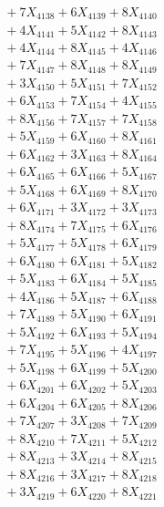 \documentclass[a4paper,10pt]{article}
\begin{document}
{\begin{align}
&\;  + 7 X_{4138} + 6 X_{4139} + 8 X_{4140} \\[0.3ex]
&\;  + 4 X_{4141} + 5 X_{4142} + 8 X_{4143} \\[0.3ex]
&\;  + 4 X_{4144} + 8 X_{4145} + 4 X_{4146} \\[0.3ex]
&\;  + 7 X_{4147} + 8 X_{4148} + 8 X_{4149} \\[0.5ex]\allowbreak
&\;  + 3 X_{4150} + 5 X_{4151} + 7 X_{4152} \\[0.3ex]
&\;  + 6 X_{4153} + 7 X_{4154} + 4 X_{4155} \\[0.3ex]
&\;  + 8 X_{4156} + 7 X_{4157} + 7 X_{4158} \\[0.3ex]
&\;  + 5 X_{4159} + 6 X_{4160} + 8 X_{4161} \\[0.3ex]
&\;  + 6 X_{4162} + 3 X_{4163} + 8 X_{4164} \\[0.3ex]
&\;  + 6 X_{4165} + 6 X_{4166} + 5 X_{4167} \\[0.3ex]
&\;  + 5 X_{4168} + 6 X_{4169} + 8 X_{4170} \\[0.3ex]
&\;  + 6 X_{4171} + 3 X_{4172} + 3 X_{4173} \\[0.3ex]
&\;  + 8 X_{4174} + 7 X_{4175} + 6 X_{4176} \\[0.3ex]
&\;  + 5 X_{4177} + 5 X_{4178} + 6 X_{4179} \\[0.5ex]\allowbreak
&\;  + 6 X_{4180} + 6 X_{4181} + 5 X_{4182} \\[0.3ex]
&\;  + 5 X_{4183} + 6 X_{4184} + 5 X_{4185} \\[0.3ex]
&\;  + 4 X_{4186} + 5 X_{4187} + 6 X_{4188} \\[0.3ex]
&\;  + 7 X_{4189} + 5 X_{4190} + 6 X_{4191} \\[0.3ex]
&\;  + 5 X_{4192} + 6 X_{4193} + 5 X_{4194} \\[0.3ex]
&\;  + 7 X_{4195} + 5 X_{4196} + 4 X_{4197} \\[0.3ex]
&\;  + 5 X_{4198} + 6 X_{4199} + 5 X_{4200} \\[0.3ex]
&\;  + 6 X_{4201} + 6 X_{4202} + 5 X_{4203} \\[0.3ex]
&\;  + 6 X_{4204} + 6 X_{4205} + 8 X_{4206} \\[0.3ex]
&\;  + 7 X_{4207} + 3 X_{4208} + 7 X_{4209} \\[0.5ex]\allowbreak
&\;  + 8 X_{4210} + 7 X_{4211} + 5 X_{4212} \\[0.3ex]
&\;  + 8 X_{4213} + 3 X_{4214} + 8 X_{4215} \\[0.3ex]
&\;  + 8 X_{4216} + 3 X_{4217} + 8 X_{4218} \\[0.3ex]
&\;  + 3 X_{4219} + 6 X_{4220} + 8 X_{4221} \\[0.3ex]

\end{align}}
\end{document}
